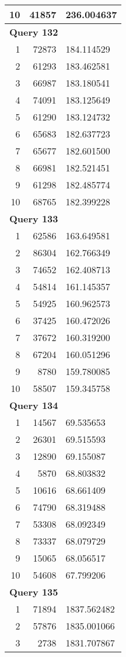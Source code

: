 \begin{longtable}[{p}]{@{}rrp{}@{}}
10 & 41857 & 236.004637 \\
\midrule
\multicolumn{3}{l}{\bfseries Query 132} \\
1 & 72873 & 184.114529 \\
2 & 61293 & 183.462581 \\
3 & 66987 & 183.180541 \\
4 & 74091 & 183.125649 \\
5 & 61290 & 183.124732 \\
6 & 65683 & 182.637723 \\
7 & 65677 & 182.601500 \\
8 & 66981 & 182.521451 \\
9 & 61298 & 182.485774 \\
10 & 68765 & 182.399228 \\
\midrule
\multicolumn{3}{l}{\bfseries Query 133} \\
1 & 62586 & 163.649581 \\
2 & 86304 & 162.766349 \\
3 & 74652 & 162.408713 \\
4 & 54814 & 161.145357 \\
5 & 54925 & 160.962573 \\
6 & 37425 & 160.472026 \\
7 & 37672 & 160.319200 \\
8 & 67204 & 160.051296 \\
9 & 8780 & 159.780085 \\
10 & 58507 & 159.345758 \\
\midrule
\multicolumn{3}{l}{\bfseries Query 134} \\
1 & 14567 & 69.535653 \\
2 & 26301 & 69.515593 \\
3 & 12890 & 69.155087 \\
4 & 5870 & 68.803832 \\
5 & 10616 & 68.661409 \\
6 & 74790 & 68.319488 \\
7 & 53308 & 68.092349 \\
8 & 73337 & 68.079729 \\
9 & 15065 & 68.056517 \\
10 & 54608 & 67.799206 \\
\midrule
\multicolumn{3}{l}{\bfseries Query 135} \\
1 & 71894 & 1837.562482 \\
2 & 57876 & 1835.001066 \\
3 & 2738 & 1831.707867 \\

\end{longtable}

